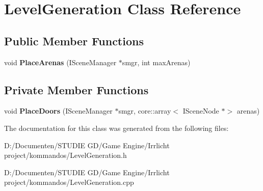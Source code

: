 \hypertarget{class_level_generation}{}\section{Level\+Generation Class Reference}
\label{class_level_generation}
\subsection*{Public Member Functions}
\begin{DoxyCompactItemize}
\item 
\mbox{\label{class_level_generation_a3eebfed13225b555bd0530503908f4be}} 
void {\bfseries Place\+Arenas} (I\+Scene\+Manager $\ast$smgr, int max\+Arenas)
\end{DoxyCompactItemize}
\subsection*{Private Member Functions}
\begin{DoxyCompactItemize}
\item 
\mbox{\label{class_level_generation_acf33a455315bb333e8d218a27ab00c2e}} 
void {\bfseries Place\+Doors} (I\+Scene\+Manager $\ast$smgr, core\+::array$<$ I\+Scene\+Node $\ast$$>$ arenas)
\end{DoxyCompactItemize}


The documentation for this class was generated from the following files\+:\begin{DoxyCompactItemize}
\item 
D\+:/\+Documenten/\+S\+T\+U\+D\+I\+E G\+D/\+Game Engine/\+Irrlicht project/kommandos/Level\+Generation.\+h\item 
D\+:/\+Documenten/\+S\+T\+U\+D\+I\+E G\+D/\+Game Engine/\+Irrlicht project/kommandos/Level\+Generation.\+cpp\end{DoxyCompactItemize}
